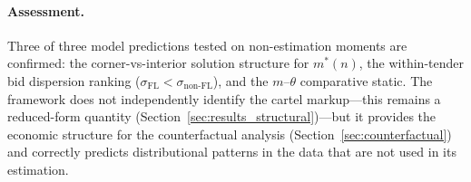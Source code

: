 \paragraph{Assessment.}
Three of three model predictions tested on non-estimation moments are
confirmed: the corner-vs-interior solution structure for $m^*(n)$,
the within-tender bid dispersion ranking ($\sigma_{\text{FL}} <
\sigma_{\text{non-FL}}$), and the $m$--$\theta$ comparative static.
The framework does not independently identify the cartel markup---this
remains a reduced-form quantity
(Section~\ref{sec:results_structural})---but it provides
the economic structure for the counterfactual analysis
(Section~\ref{sec:counterfactual}) and correctly predicts
distributional patterns in the data that are not used in its
estimation.
